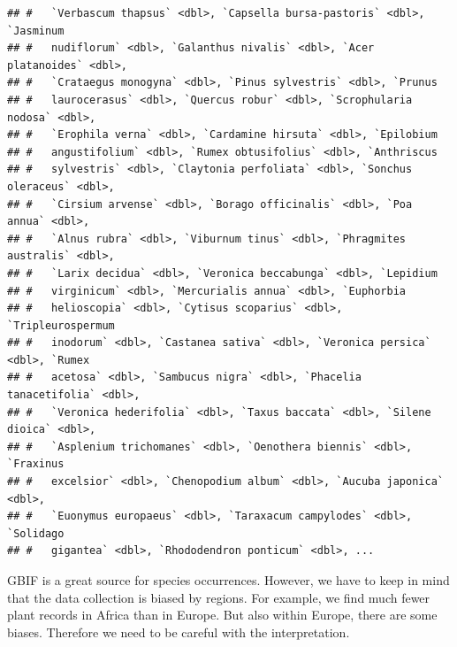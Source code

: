 \documentclass[
]{book}
\newenvironment{Shaded}{\begin{snugshade}}{\end{snugshade}}
\newcommand{\KeywordTok}[1]{\textcolor[rgb]{0.13,0.29,0.53}{\textbf{#1}}}
\newcommand{\NormalTok}[1]{#1}
\newcommand{\OperatorTok}[1]{\textcolor[rgb]{0.81,0.36,0.00}{\textbf{#1}}}
\newcommand{\StringTok}[1]{\textcolor[rgb]{0.31,0.60,0.02}{#1}}
\begin{document}
\begin{verbatim}
## #   `Verbascum thapsus` <dbl>, `Capsella bursa-pastoris` <dbl>, `Jasminum
## #   nudiflorum` <dbl>, `Galanthus nivalis` <dbl>, `Acer platanoides` <dbl>,
## #   `Crataegus monogyna` <dbl>, `Pinus sylvestris` <dbl>, `Prunus
## #   laurocerasus` <dbl>, `Quercus robur` <dbl>, `Scrophularia nodosa` <dbl>,
## #   `Erophila verna` <dbl>, `Cardamine hirsuta` <dbl>, `Epilobium
## #   angustifolium` <dbl>, `Rumex obtusifolius` <dbl>, `Anthriscus
## #   sylvestris` <dbl>, `Claytonia perfoliata` <dbl>, `Sonchus oleraceus` <dbl>,
## #   `Cirsium arvense` <dbl>, `Borago officinalis` <dbl>, `Poa annua` <dbl>,
## #   `Alnus rubra` <dbl>, `Viburnum tinus` <dbl>, `Phragmites australis` <dbl>,
## #   `Larix decidua` <dbl>, `Veronica beccabunga` <dbl>, `Lepidium
## #   virginicum` <dbl>, `Mercurialis annua` <dbl>, `Euphorbia
## #   helioscopia` <dbl>, `Cytisus scoparius` <dbl>, `Tripleurospermum
## #   inodorum` <dbl>, `Castanea sativa` <dbl>, `Veronica persica` <dbl>, `Rumex
## #   acetosa` <dbl>, `Sambucus nigra` <dbl>, `Phacelia tanacetifolia` <dbl>,
## #   `Veronica hederifolia` <dbl>, `Taxus baccata` <dbl>, `Silene dioica` <dbl>,
## #   `Asplenium trichomanes` <dbl>, `Oenothera biennis` <dbl>, `Fraxinus
## #   excelsior` <dbl>, `Chenopodium album` <dbl>, `Aucuba japonica` <dbl>,
## #   `Euonymus europaeus` <dbl>, `Taraxacum campylodes` <dbl>, `Solidago
## #   gigantea` <dbl>, `Rhododendron ponticum` <dbl>, ...
\end{verbatim}

GBIF is a great source for species occurrences. However, we have to keep in mind that the data collection is biased by regions. For example, we find much fewer plant records in Africa than in Europe. But also within Europe, there are some biases. Therefore we need to be careful with the interpretation.

\begin{Shaded}
\end{Shaded}
\end{document}
